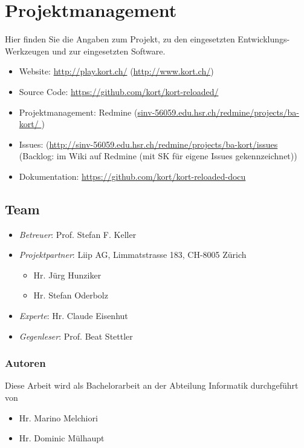 \chapter{Projektmanagement}
\label{pm-projektmanagement}
Hier finden Sie die Angaben zum Projekt, zu den eingesetzten Entwicklungs-Werkzeugen und zur eingesetzten Software.

\begin{itemize}
    \item Website: \url{http://play.kort.ch/} (\url{http://www.kort.ch/})
    \item Source Code: \url{https://github.com/kort/kort-reloaded/}
    \item Projektmanagement: Redmine (\url{sinv-56059.edu.hsr.ch/redmine/projects/ba-kort/ })
    \item Issues: (\url{http://sinv-56059.edu.hsr.ch/redmine/projects/ba-kort/issues}  (Backlog: im Wiki auf Redmine (mit SK für eigene Issues gekennzeichnet)) 
    \item Dokumentation: \url{https://github.com/kort/kort-reloaded-docu}
\end{itemize}


\section{Team}
\label{pm-rollen}
\begin{itemize}
	\item \textit{Betreuer}: Prof. Stefan F. Keller
	\item \textit{Projektpartner}: Liip AG, Limmatstrasse 183, CH-8005 Zürich
	\begin{itemize}
		\item Hr. Jürg Hunziker
		\item Hr. Stefan Oderbolz
	\end{itemize}
	\item \textit{Experte}: Hr. Claude Eisenhut
	\item \textit{Gegenleser}: Prof. Beat Stettler
\end{itemize}

\subsection*{Autoren}
Diese Arbeit wird als Bachelorarbeit an der Abteilung Informatik durchgeführt von
\begin{itemize}
	\item Hr. Marino Melchiori
	\item Hr. Dominic Mülhaupt
\end{itemize}


